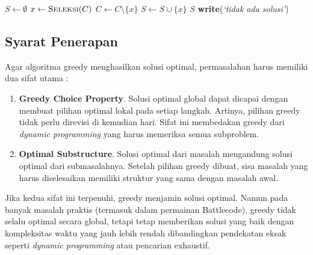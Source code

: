 \begin{algorithm}[H]
  \caption{Algoritma Greedy Umum}
  \label{alg:greedy}
  \begin{algorithmic}[1]
    \State $S \gets \emptyset$ 
    \State $x \gets \textsc{Seleksi}(C)$ 
    \State $C \gets C \setminus \{x\}$ 
     
    \State $S \gets S \cup \{x\}$
    \EndIf
    \EndWhile
     
    \State \Return $S$
    \Else
    \State \textbf{write}(\textit{`tidak ada solusi'})
    \EndIf
    \EndFunction
  \end{algorithmic}
\end{algorithm}
\subsection{Syarat Penerapan}

Agar algoritma greedy menghasilkan solusi optimal, permasalahan harus memiliki dua sifat utama \cite{cormen2009introduction}:

\begin{enumerate}
  \item \textbf{Greedy Choice Property}. Solusi optimal global dapat dicapai dengan membuat pilihan optimal lokal pada setiap langkah. Artinya, pilihan greedy tidak perlu direvisi di kemudian hari. Sifat ini membedakan greedy dari \textit{dynamic programming} yang harus memeriksa semua subproblem.

  \item \textbf{Optimal Substructure}. Solusi optimal dari masalah mengandung solusi optimal dari submasalahnya. Setelah pilihan greedy dibuat, sisa masalah yang harus diselesaikan memiliki struktur yang sama dengan masalah awal.
\end{enumerate}

Jika kedua sifat ini terpenuhi, greedy menjamin solusi optimal. Namun pada banyak masalah praktis (termasuk dalam permainan Battlecode), greedy tidak selalu optimal secara global, tetapi tetap memberikan solusi yang baik dengan kompleksitas waktu yang jauh lebih rendah dibandingkan pendekatan eksak seperti \textit{dynamic programming} atau pencarian exhaustif.

